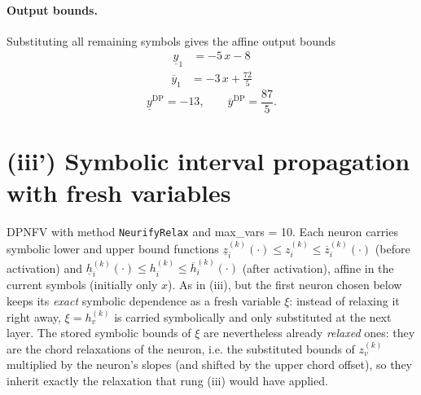 \documentclass[11pt]{article}
\begin{document}
\paragraph{Output bounds.}
Substituting all remaining symbols gives the affine output bounds
\begin{align*}
\underline{y}_{1} &= -5\,x - 8
\end{align*}
\begin{align*}
\overline{y}_{1} &= -3\,x + \frac{72}{5}
\end{align*}
\begin{equation*}
\underline{y}^{\text{DP}} = -13, \qquad \overline{y}^{\text{DP}} = \frac{87}{5}.
\end{equation*}

\section{(iii') Symbolic interval propagation with fresh variables}
DPNFV with method \texttt{NeurifyRelax} and max\_vars = 10. Each neuron carries symbolic lower and upper bound functions
$\underline{z}^{(k)}_i(\cdot) \le z^{(k)}_i \le \overline{z}^{(k)}_i(\cdot)$ (before activation)
and $\underline{h}^{(k)}_i(\cdot) \le h^{(k)}_i \le \overline{h}^{(k)}_i(\cdot)$ (after activation),
affine in the current symbols (initially only $x$).
As in (iii), but the first neuron chosen below keeps its \emph{exact}
symbolic dependence as a fresh variable $\xi$: instead of relaxing it right away, $\xi = h^{(k)}_v$
is carried symbolically and only substituted at the next layer. The stored symbolic bounds of $\xi$
are nevertheless already \emph{relaxed} ones: they are the chord relaxations of the neuron, i.e.
the substituted bounds of $z^{(k)}_v$ multiplied by the neuron's slopes (and shifted by the upper
chord offset), so they inherit exactly the relaxation that rung (iii) would have applied.
\end{document}
